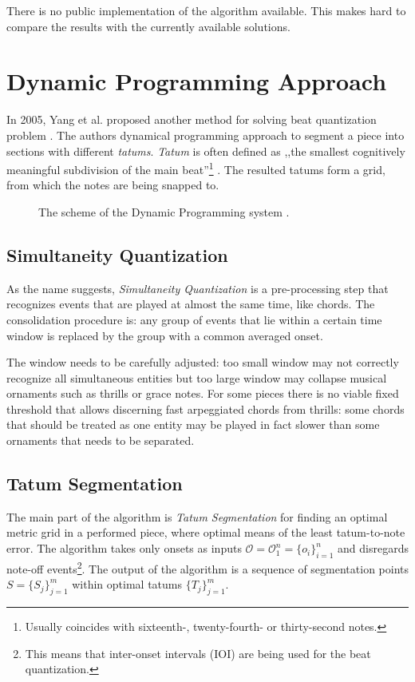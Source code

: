 There is no public implementation of the algorithm available. This makes hard to compare the results with the currently available solutions.

\section{Dynamic Programming Approach}

In 2005, Yang et al. proposed another method for solving beat quantization problem \cite{Yang2005}. The authors dynamical programming approach to segment a piece into sections with different \emph{tatums}. \emph{Tatum} is often defined as ,,the smallest cognitively meaningful
subdivision of the main beat''\footnote{Usually coincides with sixteenth-, twenty-fourth- or thirty-second notes.} \cite{Iyer1997}. The resulted tatums form a grid, from which the notes are being snapped to.

\begin{figure}[!ht]
\centering

\caption[The scheme of the Dynamic Programming system]{The scheme of the Dynamic Programming system \cite{Yang2005}.}
\end{figure}

\subsection{Simultaneity Quantization}

As the name suggests, \emph{Simultaneity Quantization} is a pre-processing step that recognizes events that are played at almost the same time, like chords. The consolidation procedure is: any group of events that lie within a certain time window is replaced by the group with a common averaged onset. 

The window needs to be carefully adjusted: too small window may not correctly recognize all simultaneous entities but too large window may collapse musical ornaments such as thrills or grace notes. For some pieces there is no viable fixed threshold that allows discerning fast arpeggiated chords from thrills: some chords that should be treated as one entity may be played in fact slower than some ornaments that needs to be separated.

\subsection{Tatum Segmentation}

The main part of the algorithm is \emph{Tatum Segmentation} for finding an optimal metric grid in a performed piece, where optimal means of the least tatum-to-note error. The algorithm takes only onsets as inputs $\mathcal{O}=\mathcal{O}_1^n=\{o_i\}_{i=1}^n$ and disregards note-off events\footnote{This means that inter-onset intervals (IOI) are being used for the beat quantization.}. The output of the algorithm is a sequence of segmentation points $S=\{S_j\}_{j=1}^m$ within optimal tatums $\{T_j\}_{j=1}^m$.

